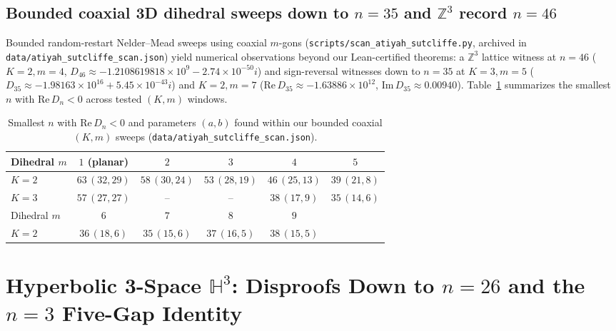 \documentclass[11pt,reqno]{amsart}
\theoremstyle{remark}
\newcommand{\Z}{\mathbb{Z}}
\newcommand{\Hy}{\mathbb{H}}
\begin{document}
\subsection{Bounded coaxial 3D dihedral sweeps down to $n = 35$ and $\Z^3$ record $n = 46$}
Bounded random-restart Nelder--Mead sweeps using coaxial $m$-gons (\texttt{scripts/scan\_atiyah\_sutcliffe.py}, archived in \texttt{data/atiyah\_sutcliffe\_scan.json}) yield numerical observations beyond our Lean-certified theorems: a $\Z^3$ lattice witness at $n = 46$ ($K=2, m=4$, $D_{46} \approx -1.2108619818 \times 10^9 - 2.74 \times 10^{-50} i$) and sign-reversal witnesses down to $n = 35$ at $K=3, m=5$ ($D_{35} \approx -1.98163 \times 10^{16} + 5.45 \times 10^{-43} i$) and $K=2, m=7$ ($\mathrm{Re}\, D_{35} \approx -1.63886 \times 10^{12}$, $\mathrm{Im}\, D_{35} \approx 0.00940$).
Table~\ref{tab:coaxial-sweep} summarizes the smallest $n$ with $\mathrm{Re}\, D_n < 0$ across tested $(K, m)$ windows.

\begin{table}[h]
\centering
\footnotesize
\setlength{\tabcolsep}{4pt}
\caption{Smallest $n$ with $\mathrm{Re}\, D_n < 0$ and parameters $(a, b)$ found within our bounded coaxial $(K, m)$ sweeps (\texttt{data/atiyah\_sutcliffe\_scan.json}).}
\label{tab:coaxial-sweep}
\begin{tabular}{lccccc}
\toprule
Dihedral $m$ & $1$ (planar) & $2$ & $3$ & $4$ & $5$ \\
\midrule
$K = 2$ & $63\,(32,29)$ & $58\,(30,24)$ & $53\,(28,19)$ & $46\,(25,13)$ & $39\,(21,8)$ \\
$K = 3$ & $57\,(27,27)$ & -- & -- & $38\,(17,9)$ & $35\,(14,6)$ \\
\midrule
Dihedral $m$ & $6$ & $7$ & $8$ & $9$ & \\
\midrule
$K = 2$ & $36\,(18,6)$ & $35\,(15,6)$ & $37\,(16,5)$ & $38\,(15,5)$ & \\
\bottomrule
\end{tabular}
\end{table}

\section{Hyperbolic 3-Space $\Hy^3$: Disproofs Down to $n = 26$ and the $n = 3$ Five-Gap Identity}\label{sec:hyperbolic}
\end{document}
